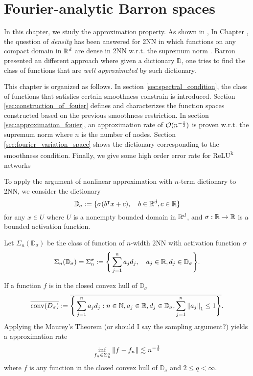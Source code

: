 \chapter{Fourier-analytic Barron spaces}
\label{sec:fourier}

In this chapter, we study the approximation property. As shown in
\cite{barronUniversalApproximationBounds1993}, 
In Chapter \TODO, the question of \textit{density} has been answered for 2NN in
which functions on any compact domain in $\mathbb{R}^d$ are dense in 2NN w.r.t. the
supremum norm . Barron presented an different
approach where given a dictionary $\mathbb{D}$, one tries to find the class of
functions that are \textit{well approximated} by such dictionary.

This chapter is organized as follows. In section \ref{sec:spectral_condition},
the class of functions that satisfies certain smoothness constrain is
introduced. Section \ref{sec:construction_of_fouier} defines and characterizes
the function spaces constructed based on the previous smoothness restriction. In
section \ref{sec:approximation_fouier}, an approximation rate of
$\mathcal{O}(n^{-\frac{1}{2}})$ is proven w.r.t. the supremum norm where $n$ is the
number of nodes. Section \ref{sec:fourier_variation_space} shows the dictionary
corresponding to the smoothness condition. Finally, we give some high order
error rate for ReLU\textsuperscript{k} networks

To apply the argument of nonlinear approximation with $n$-term dictionary to
2NN, we consider the dictionary
\begin{equation}
    \mathbb{D}_{\sigma} := \{
        \sigma(b{}^{\intercal} x + c), \quad b\in\mathbb{R}^d, c\in\mathbb{R}
    \}
\end{equation}
for any $x \in U$ where $U$ is a nonempty bounded domain in $\mathbb{R}^d$, and
$\sigma:\mathbb{R}\to\mathbb{R}$ is a bounded activation function.

Let $\Sigma_n(\mathbb{D}_{\sigma})$ be the class of function of $n$-width 2NN
with activation function $\sigma$
\begin{equation}
    \Sigma_n(\mathbb{D}_{\sigma}) = \Sigma_n^{\sigma}
    := \Bigg\{
        \sum_{j=1}^n a_j d_j, \quad a_j\in\mathbb{R}, d_j\in \mathbb{D}_{\sigma}
    \Bigg\}.
\end{equation}

If a function $f$ is in the closed convex hull of $\mathbb{D}_{\sigma}$
\begin{equation}
    \overline{\operatorname*{conv}(D_{\sigma})} :=
    \overline{
        \Bigg\{ 
            \sum_{j=1}^n a_j d_j: 
            n\in\mathbb{N}, a_j\in\mathbb{R}, d_j\in\mathbb{D}_{\sigma}, 
            \sum_{j=1}^n \left\| a_j \right\|_1 \leq 1
        \Bigg\}
    }.
\end{equation}
Applying the Maurey's Theorem (\TODO or should I say the sampling argument?)
yields a approximation rate
\begin{equation}
    \inf_{f_n\in\Sigma_n^{\sigma}} \left\| f - f_n \right\| 
    \lesssim n^{-\frac{1}{2}}
\end{equation}
where $f$ is any function in the closed convex hull of $\mathbb{D}_{\sigma}$
and $2 \leq q < \infty$.

